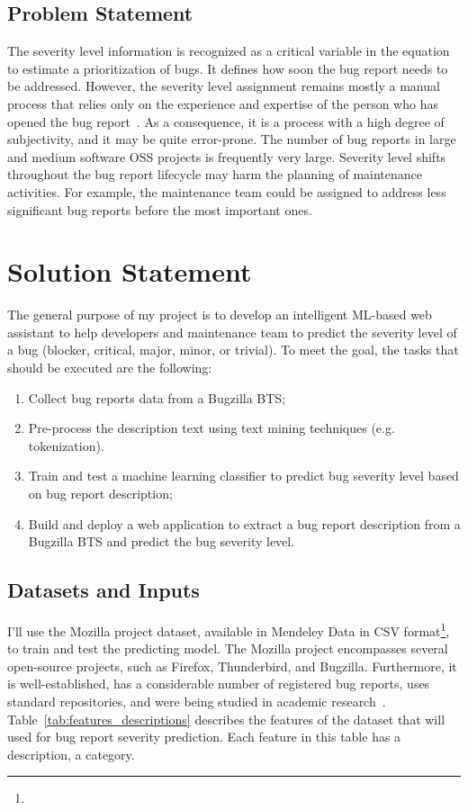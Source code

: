 \documentclass[a4paper]{article}
\begin{document}
\subsection{Problem Statement}
The severity level information is recognized as a critical variable in the equation to estimate a prioritization of bugs. It defines how soon the bug report needs to be addressed. However, the severity level assignment remains mostly a manual process that relies only on the experience and expertise of the person who has opened the bug report~\cite{Yang:2017}. As a consequence, it is a process with a high degree of subjectivity, and it may be quite error-prone. The number of bug reports in large and medium software OSS projects is frequently very large. Severity level shifts throughout the bug report lifecycle may harm the planning of maintenance activities. For example, the maintenance team could be assigned to address less significant bug reports before the most important ones.

\bigskip

\section{Solution Statement}
The general purpose of my project is to develop an intelligent ML-based web assistant to help developers and maintenance team to predict the severity level of a bug (blocker, critical, major, minor, or trivial). To meet the goal, the tasks that should be executed are the following:
\begin{enumerate}
    \item Collect bug reports data from a Bugzilla BTS;
    \item Pre-process the description text using text mining techniques (e.g. tokenization).
    \item Train and test a machine learning classifier to predict bug severity level based on bug report description;
    \item Build and deploy a web application to extract a bug report description from a Bugzilla BTS and predict the bug severity level.
\end{enumerate}
\subsection{Datasets and Inputs}
I'll use the Mozilla project dataset, available in Mendeley Data in CSV format\footnote{}, to train and test the predicting model. The Mozilla project encompasses several open-source projects, such as Firefox, Thunderbird, and Bugzilla. Furthermore, it is well-established, has a considerable number of registered bug reports, uses standard repositories, and were being studied in academic research~\cite{Lamkanfi:2010, Lamkanfi:2011, Tian:2012}. Table~\ref{tab:features_descriptions} describes the features of the dataset that will used for bug report severity prediction. Each feature in this table has a description, a category.
\end{document}
